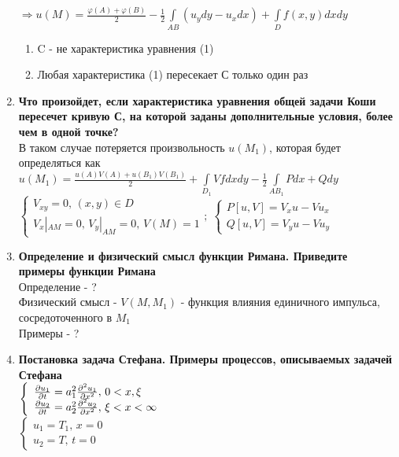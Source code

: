 \begin{enumerate}
      $\Rightarrow u(M)=\frac{\varphi(A)+\varphi(B)}{2}-\frac{1}{2}\int\limits_{AB}(u_y dy-u_x dx)+\int\limits_D f(x,y)dxdy$\\
      \begin{enumerate}
      \item C - не характеристика уравнения (1)
      \item Любая характеристика (1) пересекает С только один раз
      \end{enumerate}
\item \textbf{Что произойдет, если характеристика уравнения общей задачи Коши пересечет кривую С, на которой заданы дополнительные условия, более чем в одной точке?}\\
      В таком случае потеряется произвольность $u(M_1)$, которая будет определяться как\\
      $ u(M_1)=\frac{u(A)V(A)+u(B_1)V(B_1)}{2}+\int\limits_{D_1}Vfdxdy-\frac{1}{2}\int\limits_{AB_1}Pdx+Qdy$\\
      $\left\{\begin{array}{l}
            V_{xy}=0,\,(x,y)\in D\\
            V_x|_{AM}=0,\,V_y|_{AM}=0,\,V(M)=1
      \end{array}\right.;\;
      \left\{\begin{array}{l}
            P[u,V]=V_x u-Vu_x\\
            Q[u,V]=V_y u-Vu_y
      \end{array}\right.$
\item \textbf{Определение и физический смысл функции Римана. Приведите примеры функции Римана}\\
      Определение - ?\\
      Физический смысл - $V(M,M_1)$ - функция влияния единичного импульса, сосредоточенного в $M_1$\\
      Примеры - ?
\item \textbf{Постановка задача Стефана. Примеры процессов, описываемых задачей Стефана}\\
      $\left\{\begin{array}{l}
            \frac{\partial u_1}{\partial t}=a_1^2\frac{\partial^2 u_1}{\partial x^2},\,0<x,\xi\\
            \frac{\partial u_2}{\partial t}=a_2^2\frac{\partial^2 u_2}{\partial x^2},\,\xi<x<\infty
      \end{array}\right.$\\
      $\left\{\begin{array}{l}
            u_1 = T_1,\,x=0\\
            u_2 = T,\,t=0
      \end{array}\right.$\\

\end{enumerate}
